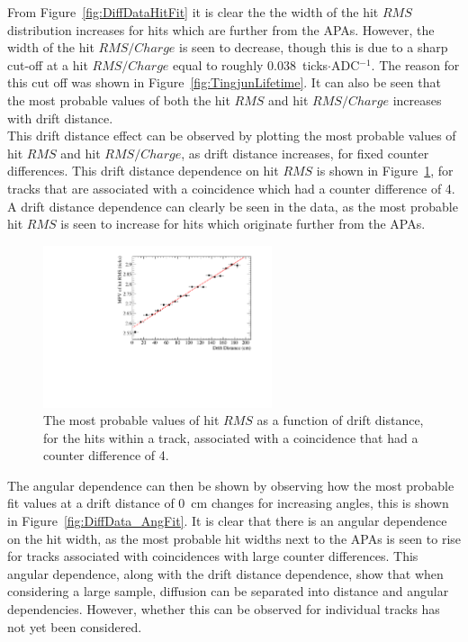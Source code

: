 From Figure~\ref{fig:DiffDataHitFit} it is clear the the width of the hit $RMS$ distribution increases for hits which are further from the APAs. However, the width of the hit $RMS/Charge$ is seen to decrease, though this is due to a sharp cut-off at a hit $RMS/Charge$ equal to roughly 0.038~ticks$\cdot$ADC$^{-1}$. The reason for this cut off was shown in Figure~\ref{fig:TingjunLifetime}. It can also be seen that the most probable values of both the hit $RMS$ and hit $RMS/Charge$ increases with drift distance. \\

This drift distance effect can be observed by plotting the most probable values of hit $RMS$ and hit $RMS/Charge$, as drift distance increases, for fixed counter differences. This drift distance dependence on hit $RMS$ is shown in Figure~\ref{fig:CDiff4DataFit}, for tracks that are associated with a coincidence which had a counter difference of 4. A drift distance dependence can clearly be seen in the data, as the most probable hit $RMS$ is seen to increase for hits which originate further from the APAs. \\

\begin{figure}
  \centering
  \includegraphics[width=0.6\textwidth]{CounterDiff4_Data}
  \caption[The drift distance dependence of diffusion in the 35 ton dataset for coincidences with a counter difference of 4]
          {The most probable values of hit $RMS$ as a function of drift distance, for the hits within a track, associated with a coincidence that had a counter difference of 4.}
  \label{fig:CDiff4DataFit}
\end{figure}

The angular dependence can then be shown by observing how the most probable fit values at a drift distance of 0~cm changes for increasing angles, this is shown in Figure~\ref{fig:DiffData_AngFit}. It is clear that there is an angular dependence on the hit width, as the most probable hit widths next to the APAs is seen to rise for tracks associated with coincidences with large counter differences. This angular dependence, along with the drift distance dependence, show that when considering a large sample, diffusion can be separated into distance and angular dependencies. However, whether this can be observed for individual tracks has not yet been considered. \\

